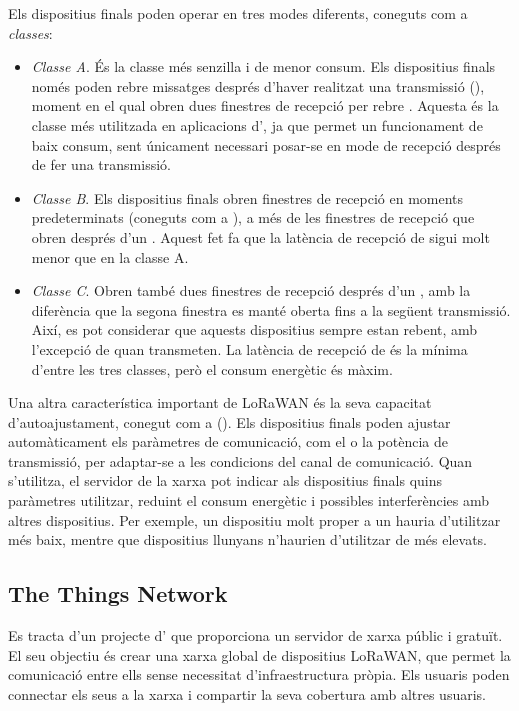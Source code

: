 \documentclass{tfgitic}[2024/07/01]
\begin{document}
Els dispositius finals poden operar en tres modes diferents, coneguts com a \emph{classes}:
\begin{itemize}
    \item \emph{Classe A}. És la classe més senzilla i de menor consum. Els dispositius finals només poden rebre missatges després d'haver realitzat una transmissió (), moment en el qual obren dues finestres de recepció per rebre . Aquesta és la classe més utilitzada en aplicacions d', ja que permet un funcionament de baix consum, sent únicament necessari posar-se en mode de recepció després de fer una transmissió.
    \item \emph{Classe B}. Els dispositius finals obren finestres de recepció en moments predeterminats (coneguts com a ), a més de les finestres de recepció que obren després d'un . Aquest fet fa que la latència de recepció de  sigui molt menor que en la classe A.
    \item \emph{Classe C}. Obren també dues finestres de recepció després d'un , amb la diferència que la segona finestra es manté oberta fins a la següent transmissió. Així, es pot considerar que aquests dispositius sempre estan rebent, amb l'excepció de quan transmeten. La latència de recepció de  és la mínima d'entre les tres classes, però el consum energètic és màxim.
\end{itemize}

Una altra característica important de LoRaWAN és la seva capacitat d'autoajustament, conegut com a  (). Els dispositius finals poden ajustar automàticament els paràmetres de comunicació, com el  o la potència de transmissió, per adaptar-se a les condicions del canal de comunicació. Quan s'utilitza, el servidor de la xarxa pot indicar als dispositius finals quins paràmetres utilitzar, reduint el consum energètic i possibles interferències amb altres dispositius. Per exemple, un dispositiu molt proper a un  hauria d'utilitzar  més baix, mentre que dispositius llunyans n'haurien d'utilitzar de més elevats.

\subsection{The Things Network}
Es tracta d'un projecte d' que proporciona un servidor de xarxa públic i gratuït. El seu objectiu és crear una xarxa global de dispositius LoRaWAN, que permet la comunicació entre ells sense necessitat d'infraestructura pròpia. Els usuaris poden connectar els seus  a la xarxa i compartir la seva cobertura amb altres usuaris.
\end{document}
